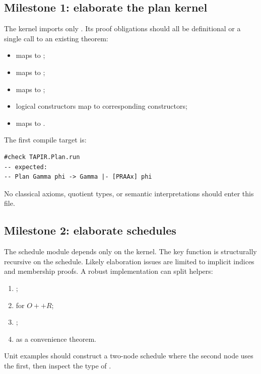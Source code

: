 \subsection{Milestone 1: elaborate the plan kernel}

The kernel imports only .  Its proof obligations should all be definitional or a
single call to an existing theorem:

\begin{itemize}
\item {} maps to ;
\item {} maps to ;
\item {} maps to ;
\item logical constructors map to corresponding  constructors;
\item {} maps to .
\end{itemize}

The first compile target is:

\begin{lstlisting}[language=Lean]
#check TAPIR.Plan.run
-- expected:
-- Plan Gamma phi -> Gamma |- [PRAAx] phi
\end{lstlisting}

No classical axioms, quotient types, or semantic interpretations should enter this file.

\subsection{Milestone 2: elaborate schedules}

The schedule module depends only on the kernel.  The key function is structurally recursive on the
schedule.  Likely elaboration issues are limited to implicit indices and membership proofs.  A robust
implementation can split helpers:

\begin{enumerate}
\item {};
\item {} for \(O++R\);
\item {};
\item {} as a convenience theorem.
\end{enumerate}

Unit examples should construct a two-node schedule where the second node uses the first, then inspect
the type of .

